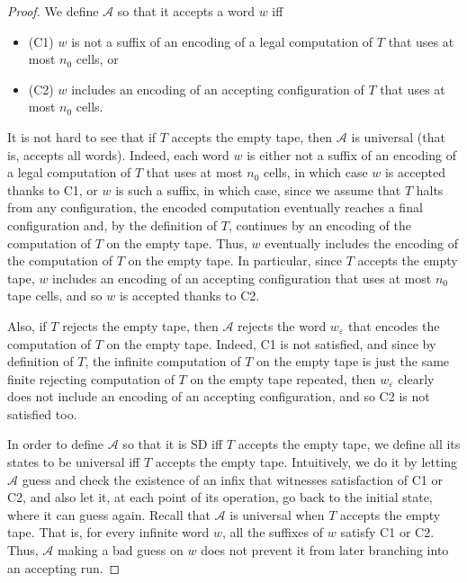 \documentclass[10pt,a4paper]{amsart}
\theoremstyle{definition}
\numberwithin{equation}{section}
\newcommand{\A}{{\mathcal A}}
\begin{document}
\begin{proof}
We define $\A$ so that it accepts a word $w$ iff 
\begin{itemize}
\item
(C1) $w$ is not a suffix of an encoding of a legal computation of $T$ that uses at most $n_0$ cells,
or 
\item
(C2) $w$ includes an encoding of an accepting configuration of $T$ that uses at most $n_0$ cells. 
\end{itemize}
It is not hard to see that if $T$ accepts the empty tape, then $\A$ is universal (that is, accepts all words). Indeed, each word $w$ is either not a suffix of an encoding of a legal computation of $T$ 
that uses at most $n_0$ cells, 
in which case $w$ is accepted thanks to C1, or $w$ is such a suffix, in which case, since we assume that $T$ halts from any configuration, the encoded computation eventually reaches a final configuration and, by the definition of $T$, continues by an encoding of the computation of $T$ on the empty tape. Thus, $w$ eventually includes the encoding of the computation of $T$ on the empty tape. In particular, since $T$ accepts the empty tape, $w$ includes an encoding of an accepting configuration that uses at most $n_0$ tape cells, and so $w$ is accepted thanks to C2.

Also, if $T$ rejects the empty tape, then $\A$ rejects the word $w_\varepsilon$ that encodes the computation of $T$ on the empty tape. Indeed, C1 is not satisfied, and since by definition of $T$, the infinite computation of $T$ on the empty tape is just the same finite rejecting computation of $T$ on the empty tape repeated, then $w_\varepsilon$ clearly does not include an encoding of an accepting configuration, and so C2 is not satisfied too. 

In order to define $\A$ so that it is SD iff $T$ accepts the empty tape, we define all its states to be universal iff $T$ accepts the empty tape. Intuitively, we do it by letting $\A$ guess and check the existence of an infix that witnesses  satisfaction of C1 or C2, and also let it, at each point of its operation, go back to the initial state, where it can guess again. Recall that $\A$ is universal when $T$ accepts the empty tape. That is, for every infinite word $w$, all the suffixes of $w$ satisfy C1 or C2. Thus, $\A$ making a bad guess on $w$ does not prevent it from later branching into an accepting run.


\end{proof}
\end{document}

